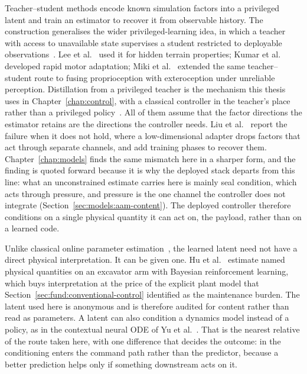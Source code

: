 Teacher--student methods encode known simulation factors into a privileged
latent and train an estimator to recover it from observable history. The
construction generalises the wider privileged-learning idea, in which a teacher
with access to unavailable state supervises a student restricted to deployable
observations~\cite{chen2019cheating}. Lee et al.~\cite{lee2020learning} used it
for hidden terrain properties; Kumar et al.~\cite{kumar2021rma} developed rapid
motor adaptation; Miki et al.~\cite{miki2022perceptive} extended the same
teacher--student route to fusing proprioception with exteroception under
unreliable perception. Distillation from a privileged teacher is the mechanism
this thesis uses in Chapter~\ref{chap:control}, with a classical controller in
the teacher's place rather than a privileged
policy~\cite{ross2011reduction}. All of them assume that the factor directions
the estimator retains are the directions the controller needs. Liu et al.~\cite{liu2025frma} report the failure when it
does not hold, where a low-dimensional adapter drops factors that act through
separate channels, and add training phases to recover them. Chapter~\ref{chap:models} finds the same
mismatch here in a sharper form, and the finding is quoted forward because it
is why the deployed stack departs from this line: what an unconstrained
estimate carries here is mainly seal condition, which acts through pressure, and
pressure is the one channel the controller does not integrate
(Section~\ref{sec:models:aam-content}). The deployed controller therefore
conditions on a single physical quantity it can act on, the payload, rather than
on a learned code.

Unlike classical online parameter estimation~\cite{astrom1995adaptive}, the
learned latent need not have a direct physical interpretation. It can be given
one. Hu et al.~\cite{hu2026bayesian} estimate named physical quantities on an
excavator arm with Bayesian reinforcement learning, which buys interpretation
at the price of the explicit plant model that
Section~\ref{sec:fund:conventional-control} identified as the maintenance
burden. The latent used here is anonymous and is therefore audited for content
rather than read as parameters. A latent can also condition a dynamics model
instead of a policy, as in the contextual neural ODE of Yu et
al.~\cite{yu2026context}. That is the nearest relative of the route taken here,
with one difference that decides the outcome: in \ppoAAMFD{} the conditioning
enters the command path rather than the predictor, because a better prediction
helps only if something downstream acts on it.

